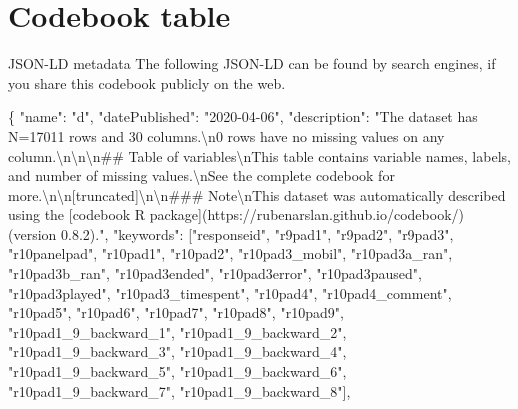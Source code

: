 \documentclass[
]{book}
\newenvironment{Shaded}{\begin{snugshade}}{\end{snugshade}}
\newcommand{\CharTok}[1]{\textcolor[rgb]{0.31,0.60,0.02}{#1}}
\newcommand{\DataTypeTok}[1]{\textcolor[rgb]{0.13,0.29,0.53}{#1}}
\newcommand{\FunctionTok}[1]{\textcolor[rgb]{0.00,0.00,0.00}{#1}}
\newcommand{\OtherTok}[1]{\textcolor[rgb]{0.56,0.35,0.01}{#1}}
\newcommand{\StringTok}[1]{\textcolor[rgb]{0.31,0.60,0.02}{#1}}
\begin{document}
\hypertarget{codebook-table-1}{%
\section{Codebook table}\label{codebook-table-1}}

\hypertarget{htmlwidget-81e0fb6725aea9bd95c4}{}

JSON-LD metadata
The following JSON-LD can be found by search engines, if you share this codebook
publicly on the web.

\begin{Shaded}
\begin{Highlighting}[]
\FunctionTok{\{}
  \DataTypeTok{"name"}\FunctionTok{:} \StringTok{"d"}\FunctionTok{,}
  \DataTypeTok{"datePublished"}\FunctionTok{:} \StringTok{"2020-04-06"}\FunctionTok{,}
  \DataTypeTok{"description"}\FunctionTok{:} \StringTok{"The dataset has N=17011 rows and 30 columns.}\CharTok{\textbackslash{}n}\StringTok{0 rows have no missing values on any column.}\CharTok{\textbackslash{}n\textbackslash{}n\textbackslash{}n}\StringTok{## Table of variables}\CharTok{\textbackslash{}n}\StringTok{This table contains variable names, labels, and number of missing values.}\CharTok{\textbackslash{}n}\StringTok{See the complete codebook for more.}\CharTok{\textbackslash{}n\textbackslash{}n}\StringTok{[truncated]}\CharTok{\textbackslash{}n\textbackslash{}n}\StringTok{### Note}\CharTok{\textbackslash{}n}\StringTok{This dataset was automatically described using the [codebook R package](https://rubenarslan.github.io/codebook/) (version 0.8.2)."}\FunctionTok{,}
  \DataTypeTok{"keywords"}\FunctionTok{:} \OtherTok{[}\StringTok{"responseid"}\OtherTok{,} \StringTok{"r9pad1"}\OtherTok{,} \StringTok{"r9pad2"}\OtherTok{,} \StringTok{"r9pad3"}\OtherTok{,} \StringTok{"r10panelpad"}\OtherTok{,} \StringTok{"r10pad1"}\OtherTok{,} \StringTok{"r10pad2"}\OtherTok{,} \StringTok{"r10pad3_mobil"}\OtherTok{,} \StringTok{"r10pad3a_ran"}\OtherTok{,} \StringTok{"r10pad3b_ran"}\OtherTok{,} \StringTok{"r10pad3ended"}\OtherTok{,} \StringTok{"r10pad3error"}\OtherTok{,} \StringTok{"r10pad3paused"}\OtherTok{,} \StringTok{"r10pad3played"}\OtherTok{,} \StringTok{"r10pad3_timespent"}\OtherTok{,} \StringTok{"r10pad4"}\OtherTok{,} \StringTok{"r10pad4_comment"}\OtherTok{,} \StringTok{"r10pad5"}\OtherTok{,} \StringTok{"r10pad6"}\OtherTok{,} \StringTok{"r10pad7"}\OtherTok{,} \StringTok{"r10pad8"}\OtherTok{,} \StringTok{"r10pad9"}\OtherTok{,} \StringTok{"r10pad1_9_backward_1"}\OtherTok{,} \StringTok{"r10pad1_9_backward_2"}\OtherTok{,} \StringTok{"r10pad1_9_backward_3"}\OtherTok{,} \StringTok{"r10pad1_9_backward_4"}\OtherTok{,} \StringTok{"r10pad1_9_backward_5"}\OtherTok{,} \StringTok{"r10pad1_9_backward_6"}\OtherTok{,} \StringTok{"r10pad1_9_backward_7"}\OtherTok{,} \StringTok{"r10pad1_9_backward_8"}\OtherTok{]}\FunctionTok{,}

\end{Highlighting}
\end{Shaded}
\end{document}
